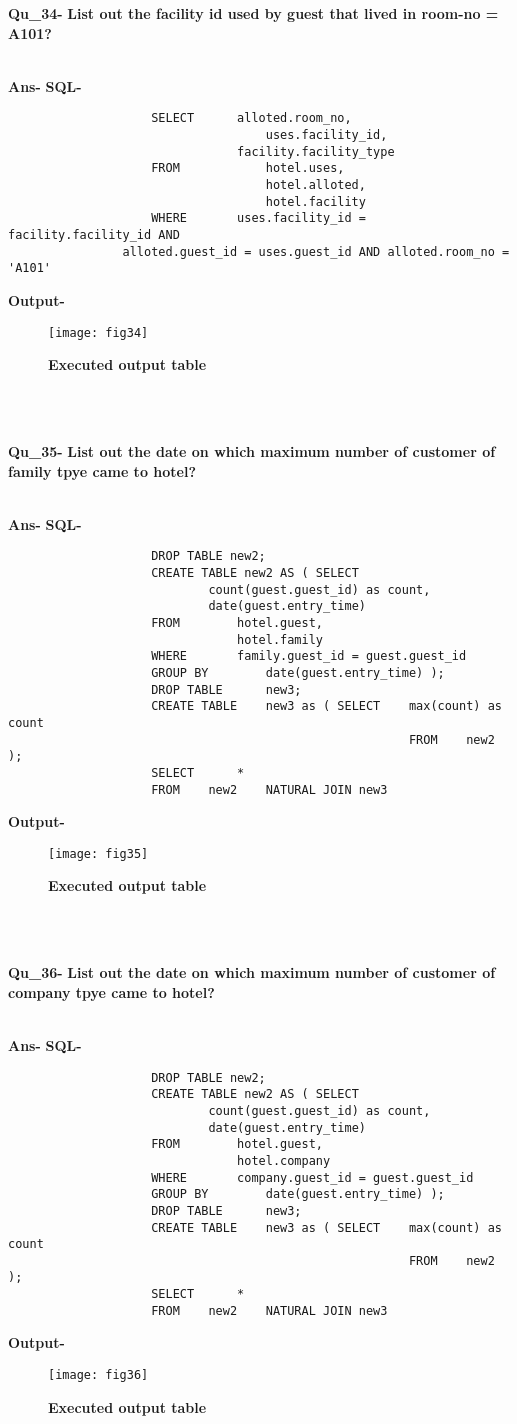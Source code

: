 \documentclass[a4,12pt]{report}
\begin{document}
\newpage
\textbf{Qu\_34-}  \textbf{List out the facility id used by guest that lived in room-no = A101?} \\\

\textbf{Ans-}		\textbf{SQL-}
\begin{lstlisting}
					SELECT 		alloted.room_no, 
  									uses.facility_id, 
	            				facility.facility_type
					FROM			hotel.uses, 
  									hotel.alloted, 
 									hotel.facility
					WHERE		uses.facility_id = facility.facility_id AND
  				alloted.guest_id = uses.guest_id AND alloted.room_no = 'A101'
\end{lstlisting}
\textbf{Output-} \\			   
\begin{figure}[hbtp]
\centering
\texttt{[image: fig34]}
\caption{\textbf{{\color{red}Executed output table}}}
\end{figure}
\\\

\textbf{Qu\_35-}  \textbf{List out the date on which maximum number of customer of family tpye came to hotel?} \\\

\textbf{Ans-}		\textbf{SQL-}
\begin{lstlisting}
					DROP TABLE new2;
					CREATE TABLE new2 AS ( SELECT  
  							count(guest.guest_id) as count,
  							date(guest.entry_time) 
					FROM		hotel.guest, 
  								hotel.family
					WHERE 		family.guest_id = guest.guest_id
					GROUP BY		date(guest.entry_time) );
					DROP TABLE 		new3;
					CREATE TABLE 	new3 as ( SELECT	max(count) as count
														FROM	new2 );
					SELECT		*
					FROM	new2	NATURAL JOIN new3
\end{lstlisting}
\textbf{Output-} \\			   
\begin{figure}[hbtp]
\centering
\texttt{[image: fig35]}
\caption{\textbf{{\color{red}Executed output table}}}
\end{figure}
\\\

\textbf{Qu\_36-}  \textbf{List out the date on which maximum number of customer of company tpye came to hotel?} \\\

\textbf{Ans-}		\textbf{SQL-}
\begin{lstlisting}
					DROP TABLE new2;
					CREATE TABLE new2 AS ( SELECT  
  							count(guest.guest_id) as count,
  							date(guest.entry_time) 
					FROM		hotel.guest, 
  								hotel.company
					WHERE 		company.guest_id = guest.guest_id
					GROUP BY		date(guest.entry_time) );
					DROP TABLE 		new3;
					CREATE TABLE 	new3 as ( SELECT	max(count) as count
														FROM	new2 );
					SELECT		*
					FROM	new2	NATURAL JOIN new3
\end{lstlisting}
\textbf{Output-} \\			   
\begin{figure}[hbtp]
\centering
\texttt{[image: fig36]}
\caption{\textbf{{\color{red}Executed output table}}}
\end{figure}
\\\
\end{document}
